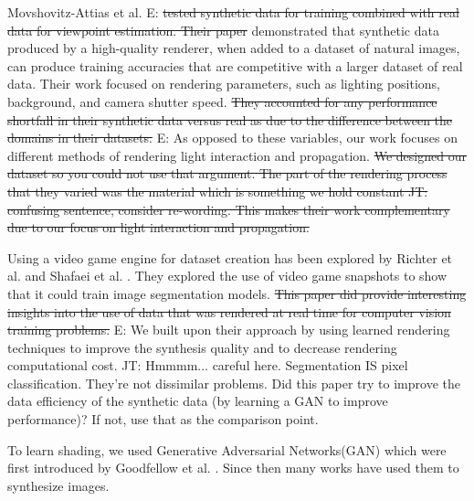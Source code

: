 \documentclass[10pt,twocolumn,letterpaper]{article}
\newcommand{\tompson}[1]{{\color{green} JT: #1}}
\newcommand{\edit}[1]{{\color{red} E: #1}}
\begin{document}
Movshovitz-Attias et al. \cite{DBLP:journals/corr/Movshovitz-Attias16} \edit{\sout{tested synthetic data for training combined with real data for viewpoint estimation. Their paper}} demonstrated that synthetic data produced by a high-quality renderer, when added to a dataset of natural images, can produce training accuracies that are competitive with a larger dataset of real data. Their work focused on rendering parameters, such as lighting positions, background, and camera shutter speed. \sout{They accounted for any performance shortfall in their synthetic data versus real as due to the difference between the domains in their datasets.}  \edit{As opposed to these variables, our work focuses on different methods of rendering light interaction and propagation.}
\sout{
We designed our dataset so you could not use that argument. The part of the rendering process that they varied was the material which is something we hold constant \tompson{confusing sentence, consider re-wording}. This makes their work complementary due to our focus on light interaction and propagation.
}

Using a video game engine for dataset creation has been explored by Richter et al. \cite{DBLP:journals/corr/RichterVRK16} and  Shafaei et al. \cite{DBLP:journals/corr/ShafaeiLS16}. They explored the use of video game snapshots to show that it could train image segmentation models. %
\sout{This paper did provide interesting insights into the use of data that was rendered at real time for computer vision training problems.} \edit{We built upon their approach by using learned rendering techniques to improve the synthesis quality and to decrease rendering computational cost.} \tompson{Hmmmm... careful here. Segmentation IS pixel classification. They're not dissimilar problems. Did this paper try to improve the data efficiency of the synthetic data (by learning a GAN to improve performance)? If not, use that as the comparison point.}


To learn shading, we used Generative Adversarial Networks(GAN) which were first introduced by Goodfellow et al. \cite{goodfellow}. Since then many works have used them to synthesize images. 
\end{document}
